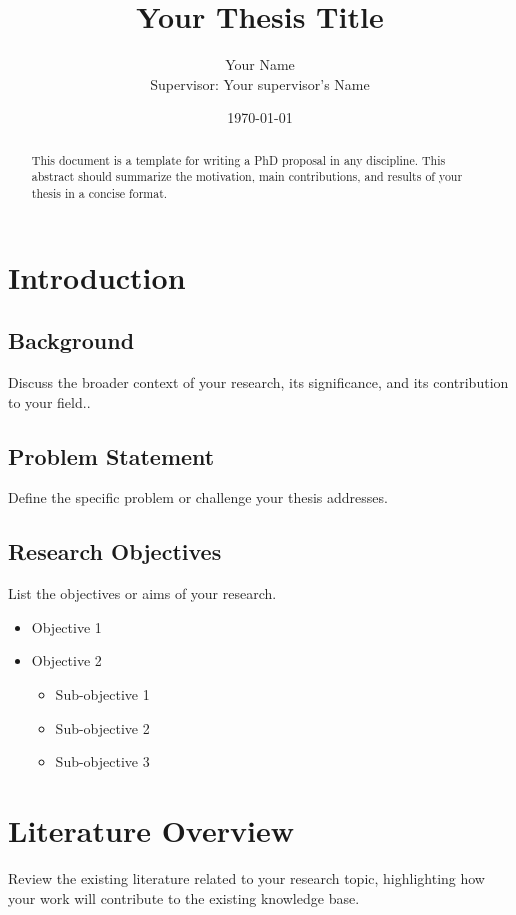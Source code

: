 \documentclass[12pt]{article}
\title{\textbf{Your Thesis Title}}
\author{Your Name \\ Supervisor: Your supervisor's Name}
\date{\today}
\begin{document}
\maketitle

\begin{abstract}
This document is a template for writing a PhD proposal in any discipline. This abstract should summarize the motivation, main contributions, and results of your thesis in a concise format.
\end{abstract}

\tableofcontents
\newpage

\section{Introduction}

\subsection{Background}
Discuss the broader context of your research, its significance, and its contribution to your field.\cite{Turing1950}. 

\subsection{Problem Statement}
Define the specific problem or challenge your thesis addresses.

\subsection{Research Objectives}
List the objectives or aims of your research.
\begin{itemize}
    \item Objective 1
    \item Objective 2
    \begin{itemize}
        \item Sub-objective 1
        \item Sub-objective 2
        \item Sub-objective 3
    \end{itemize}
\end{itemize}

\section{Literature Overview}
Review the existing literature related to your research topic, highlighting how your work will contribute to the existing knowledge base.
\end{document}
